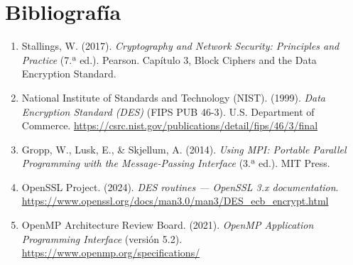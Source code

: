 \documentclass[11pt,letterpaper]{article}
\begin{document}
\section{Bibliografía}

\begin{enumerate}
    \item Stallings, W. (2017). \textit{Cryptography and Network
    Security: Principles and Practice} (7.ª ed.). Pearson. Capítulo 3,
    Block Ciphers and the Data Encryption Standard.

    \item National Institute of Standards and Technology (NIST).
    (1999). \textit{Data Encryption Standard (DES)} (FIPS PUB 46-3).
    U.S. Department of Commerce.
    \url{https://csrc.nist.gov/publications/detail/fips/46/3/final}

    \item Gropp, W., Lusk, E., \& Skjellum, A. (2014). \textit{Using
    MPI: Portable Parallel Programming with the Message-Passing
    Interface} (3.ª ed.). MIT Press.

    \item OpenSSL Project. (2024). \textit{DES routines --- OpenSSL 3.x
    documentation}.
    \url{https://www.openssl.org/docs/man3.0/man3/DES_ecb_encrypt.html}

    \item OpenMP Architecture Review Board. (2021). \textit{OpenMP
    Application Programming Interface} (versión 5.2).
    \url{https://www.openmp.org/specifications/}
\end{enumerate}
\end{document}
